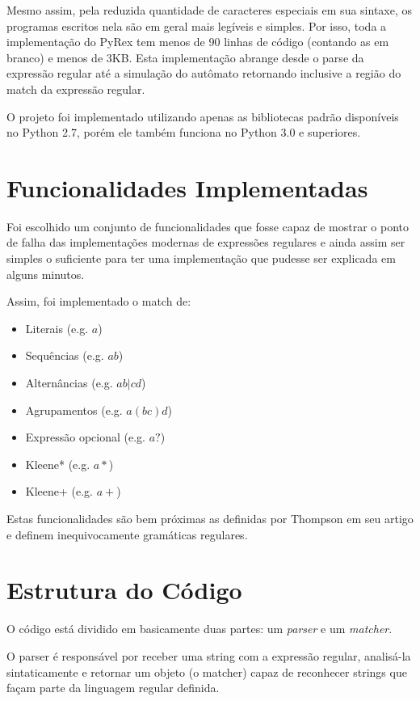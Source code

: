 \documentclass[a4paper,12pt,oneside,onecolumn]{uerj}
\begin{document}
Mesmo assim, pela reduzida quantidade de caracteres especiais em sua sintaxe, os programas escritos nela são em geral mais legíveis e simples. Por isso, toda a implementação do PyRex tem menos de 90 linhas de código (contando as em branco) e menos de 3KB. Esta implementação abrange desde o parse da expressão regular até a simulação do autômato retornando inclusive a região do match da expressão regular.

O projeto foi implementado utilizando apenas as bibliotecas padrão disponíveis no Python 2.7, porém ele também funciona no Python 3.0 e superiores.

\section{Funcionalidades Implementadas}

Foi escolhido um conjunto de funcionalidades que fosse capaz de mostrar o ponto de falha das implementações modernas de expressões regulares e ainda assim ser simples o suficiente para ter uma implementação que pudesse ser explicada em alguns minutos.

Assim, foi implementado o match de:

\begin{itemize}
    \item Literais (e.g. $a$)
    \item Sequências (e.g. $ab$)
    \item Alternâncias (e.g. $ab|cd$)
    \item Agrupamentos (e.g. $a(bc)d$)
    \item Expressão opcional (e.g. $a?$)
    \item Kleene* (e.g. $a*$)
    \item Kleene+ (e.g. $a+$)
\end{itemize}

Estas funcionalidades são bem próximas as definidas por Thompson \cite{bib:Thompson68} em seu artigo e definem inequivocamente gramáticas regulares.

\section{Estrutura do Código}

O código está dividido em basicamente duas partes: um \emph{parser} e um \emph{matcher}.

O parser é responsável por receber uma string com a expressão regular, analisá-la sintaticamente e retornar um objeto (o matcher) capaz de reconhecer strings que façam parte da linguagem regular definida.
\end{document}
